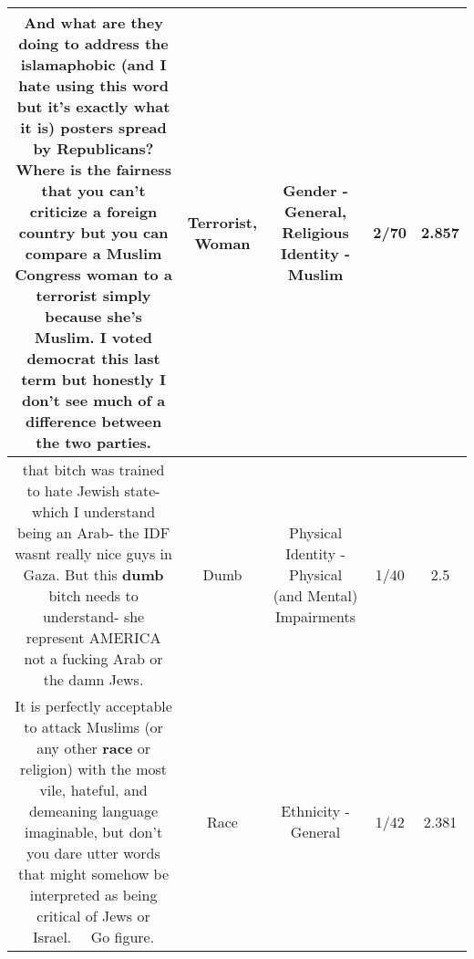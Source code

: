 \documentclass[11pt]{article}
\newlength\mylength
\begin{document}
\begin{center}
\begin{longtable}{|C{.65\mylength}|C{.30\mylength}|C{.12\mylength}|C{.12\mylength}|C{.12\mylength}|}
  \small And what are they doing to address the islamaphobic (and I hate using this word but it's exactly what it is) posters spread by Republicans? Where is the fairness that you can't criticize a foreign country but you can compare a Muslim Congress \textbf{woman} to a \textbf{terrorist} simply because she's Muslim. I voted democrat this last term but honestly I don't see much of a difference between the two parties.\normalsize   & Terrorist, Woman & Gender - General, Religious Identity - Muslim & 2/70 & 2.857 \\  \hline
  \small that bitch was trained to hate Jewish state- which I understand being an Arab- the IDF wasnt really nice guys in Gaza. But this \textbf{dumb} bitch needs to understand- she represent AMERICA not a fucking Arab or the damn Jews.\normalsize   & Dumb & Physical Identity - Physical (and Mental) Impairments & 1/40 & 2.5 \\  \hline
  \small It is perfectly acceptable to attack Muslims (or any other \textbf{race} or religion) with the most vile, hateful, and demeaning language imaginable, but don't you dare utter words that might somehow be interpreted as being critical of Jews or Israel.   Go figure.\normalsize   & Race & Ethnicity - General & 1/42 & 2.381 \\  \hline

\end{longtable}
\end{center}
\end{document}
